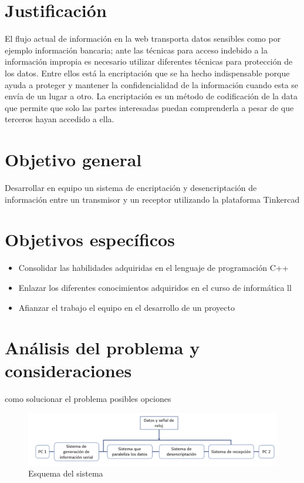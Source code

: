 \documentclass{article}
\begin{document}
\section{Justificación} 
\label{contenido}
El flujo actual de información en la web transporta datos sensibles como por ejemplo información bancaria; ante las técnicas para acceso indebido a la información impropia es necesario utilizar diferentes técnicas para protección de los datos. Entre ellos está la encriptación que se ha hecho indispensable porque ayuda a proteger y mantener la confidencialidad de la información cuando esta se envía de un lugar a otro. La encriptación es un método de codificación de la data que permite que solo las partes interesadas puedan comprenderla a pesar de que terceros hayan accedido a ella.

\section{Objetivo general} 
\label{contenido}
Desarrollar en equipo un sistema de encriptación y desencriptación de información entre un transmisor y un receptor utilizando la plataforma Tinkercad

\section{Objetivos específicos} 
\label{contenido}
\begin{itemize}
\item Consolidar las habilidades adquiridas en el lenguaje de programación C++
\item Enlazar los diferentes conocimientos adquiridos en el curso de informática ll 
\item Afianzar el trabajo el equipo en el desarrollo de un proyecto

\end{itemize}
\section{Análisis del problema y consideraciones}
como solucionar el problema
posibles opciones

    \begin{figure}[h]
    \includegraphics[width=12cm]{imagen/Sistema.png}
    \centering
    \caption{Esquema del sistema}
    \label{fig:Sistema}
    \end{figure}
\end{document}
